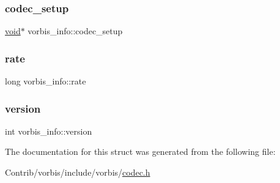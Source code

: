 \subsubsection{\texorpdfstring{codec\+\_\+setup}{codec\_setup}}
{\footnotesize\ttfamily \mbox{\hyperlink{_s_d_l__opengles2__gl2ext_8h_ae5d8fa23ad07c48bb609509eae494c95}{void}}$\ast$ vorbis\+\_\+info\+::codec\+\_\+setup}

\mbox{\label{structvorbis__info_a01879ed23ecd9605cf6779ef2663a681}} 
\subsubsection{\texorpdfstring{rate}{rate}}
{\footnotesize\ttfamily long vorbis\+\_\+info\+::rate}

\mbox{\label{structvorbis__info_a2d832259b1e3fbf4d1cd619ab5743612}} 
\subsubsection{\texorpdfstring{version}{version}}
{\footnotesize\ttfamily int vorbis\+\_\+info\+::version}



The documentation for this struct was generated from the following file\+:\begin{DoxyCompactItemize}
\item 
Contrib/vorbis/include/vorbis/\mbox{\hyperlink{codec_8h}{codec.\+h}}\end{DoxyCompactItemize}
